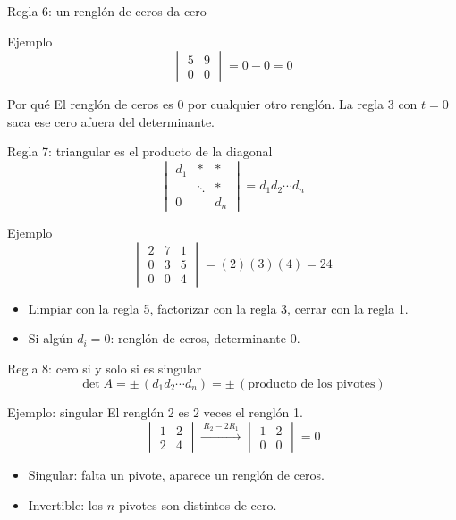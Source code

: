 \documentclass[aspectratio=169,11pt]{beamer}
\newcommand{\dt}[1]{\det #1}
\newcommand{\dbar}[1]{%
  \begin{vmatrix} #1 \end{vmatrix}%
}
\begin{document}
\begin{frame}{Regla 6: un renglón de ceros da cero}
  \begin{block}{Ejemplo}
    \[
      \dbar{5 & 9 \\ 0 & 0} = 0 - 0 = 0
    \]
  \end{block}

  \begin{block}{Por qué}
    El renglón de ceros es $0$ por cualquier otro renglón. La regla
    3 con $t = 0$ saca ese cero afuera del determinante.
  \end{block}
\end{frame}

\begin{frame}{Regla 7: triangular es el producto de la diagonal}
  \[
    \dbar{d_1 & * & * \\ & \ddots & * \\ 0 & & d_n}
      = d_1 d_2 \cdots d_n
  \]

  \begin{block}{Ejemplo}
    \[
      \dbar{2 & 7 & 1 \\ 0 & 3 & 5 \\ 0 & 0 & 4}
      = (2)(3)(4) = 24
    \]
  \end{block}

  \begin{itemize}
    \item Limpiar con la regla 5, factorizar con la regla 3, cerrar
          con la regla 1.
    \item Si algún $d_i = 0$: renglón de ceros, determinante $0$.
  \end{itemize}
\end{frame}

\begin{frame}{Regla 8: cero si y solo si es singular}
  \[
    \dt{A} = \pm\,(d_1 d_2 \cdots d_n)
    = \pm\,(\text{producto de los pivotes})
  \]

  \begin{block}{Ejemplo: singular}
    El renglón 2 es $2$ veces el renglón 1.
    \[
      \dbar{1 & 2 \\ 2 & 4}
      \xrightarrow{\ R_2 - 2R_1\ }
      \dbar{1 & 2 \\ 0 & 0} = 0
    \]
  \end{block}

  \begin{itemize}
    \item Singular: falta un pivote, aparece un renglón de ceros.
    \item Invertible: los $n$ pivotes son distintos de cero.
  \end{itemize}
\end{frame}
\end{document}
